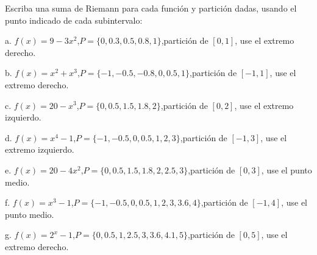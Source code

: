 




\begin{ejer}{Escriba una suma de Riemann para cada función y partición dadas, usando el punto indicado de cada subintervalo:}

a. $f(x) = 9 - 3x^{2}$,\quad $P = \{0, 0.3, 0.5, 0.8, 1\}$,\quad partición de $[0,1]$, use el extremo derecho.


b. $f(x) = x^{2} + x^{3}$,\quad $P = \{-1, -0.5, -0.8, 0, 0.5, 1\}$,\quad partición de $[-1,1]$, use el extremo derecho.


c. $f(x) = 20 - x^{3}$,\quad $P = \{0, 0.5, 1.5, 1.8, 2\}$,\quad partición de $[0,2]$, use el extremo izquierdo.


d. $f(x) = x^{4} - 1$,\quad $P = \{-1, -0.5, 0, 0.5, 1, 2, 3\}$,\quad partición de $[-1,3]$, use el extremo izquierdo.


e. $f(x) = 20 - 4x^{2}$,\quad $P = \{0, 0.5, 1.5, 1.8, 2, 2.5, 3\}$,\quad partición de $[0,3]$, use el punto medio.


f. $f(x) = x^{3} - 1$,\quad $P = \{-1, -0.5, 0, 0.5, 1, 2, 3, 3.6, 4\}$,\quad partición de $[-1,4]$, use el punto medio.


g. $f(x) = 2^{x} - 1$,\quad $P = \{0, 0.5, 1, 2.5, 3, 3.6, 4.1, 5\}$,\quad partición de $[0,5]$, use el extremo derecho.

\end{ejer}

